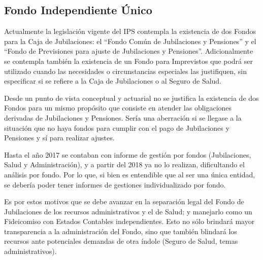 \documentclass[a4paper,11pt]{article}
\begin{document}
\subsection{Fondo Independiente Único}

Actualmente la legislación vigente del IPS contempla la existencia de dos Fondos para la Caja de Jubilaciones: el “Fondo Común de Jubilaciones y Pensiones” y el “Fondo de Previsiones para ajuste de Jubilaciones y Pensiones”.  Adicionalmente se contempla también la existencia de un Fondo para Imprevistos que podrá ser utilizado cuando las necesidades o circunstancias especiales las justifiquen, sin especificar si se refiere a la Caja de Jubilaciones o al Seguro de Salud.

Desde un punto de vista conceptual y actuarial no se justifica la existencia de dos Fondos para un mismo propósito que consiste en atender las obligaciones derivadas de Jubilaciones y Pensiones.  Sería una aberración si se llegase a la situación que no haya fondos para cumplir con el pago de Jubilaciones y Pensiones y sí para realizar ajustes.

Hasta el año 2017 se contaban con informe de gestión por fondos (Jubilaciones, Salud y Administración), y a partir del 2018 ya no lo realizan, dificultando el análisis por fondo.  Por lo que, si bien es entendible que al ser una única entidad, se debería poder tener informes de gestiones individualizado por fondo.

Es por estos motivos que se debe avanzar en la separación legal del Fondo de Jubilaciones de los recursos administrativos y el de Salud; y manejarlo como un Fideicomiso con Estados Contables independientes.  Esto no sólo brindará mayor transparencia a la administración del Fondo, sino que también blindará los recursos ante potenciales demandas de otra índole (Seguro de Salud, temas administrativos). \cite{IA_IPS2018}
\end{document}

